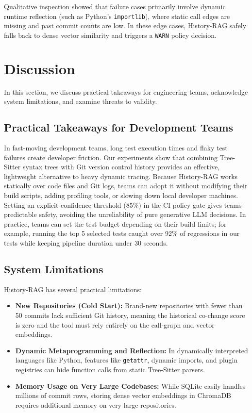 \documentclass[12pt,onecolumn,draftclsnofoot]{IEEEtran}
\begin{document}
Qualitative inspection showed that failure cases primarily involve dynamic runtime reflection (such as Python's \texttt{importlib}), where static call edges are missing and past commit counts are low. In these edge cases, History-RAG safely falls back to dense vector similarity and triggers a \texttt{WARN} policy decision.

\section{Discussion}
\label{sec:discussion}
In this section, we discuss practical takeaways for engineering teams, acknowledge system limitations, and examine threats to validity.

\subsection{Practical Takeaways for Development Teams}
In fast-moving development teams, long test execution times and flaky test failures create developer friction. Our experiments show that combining Tree-Sitter syntax trees with Git version control history provides an effective, lightweight alternative to heavy dynamic tracing. Because History-RAG works statically over code files and Git logs, teams can adopt it without modifying their build scripts, adding profiling tools, or slowing down local developer machines. Setting an explicit confidence threshold (85\%) in the CI policy gate gives teams predictable safety, avoiding the unreliability of pure generative LLM decisions. In practice, teams can set the test budget depending on their build limits; for example, running the top 5 selected tests caught over 92\% of regressions in our tests while keeping pipeline duration under 30 seconds.

\subsection{System Limitations}
History-RAG has several practical limitations:
\begin{itemize}
    \item \textbf{New Repositories (Cold Start):} Brand-new repositories with fewer than 50 commits lack sufficient Git history, meaning the historical co-change score is zero and the tool must rely entirely on the call-graph and vector embeddings.
    \item \textbf{Dynamic Metaprogramming and Reflection:} In dynamically interpreted languages like Python, features like \texttt{getattr}, dynamic imports, and plugin registries can hide function calls from static Tree-Sitter parsers.
    \item \textbf{Memory Usage on Very Large Codebases:} While SQLite easily handles millions of commit rows, storing dense vector embeddings in ChromaDB requires additional memory on very large repositories.
\end{itemize}
\end{document}
